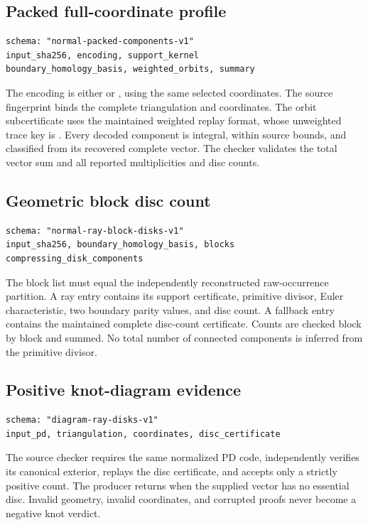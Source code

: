 \subsection{Packed full-coordinate profile}
\begin{lstlisting}
schema: "normal-packed-components-v1"
input_sha256, encoding, support_kernel
boundary_homology_basis, weighted_orbits, summary
\end{lstlisting}
The encoding is either  or , using the same selected
coordinates.  The source fingerprint binds the complete triangulation and
coordinates.  The orbit subcertificate uses the maintained weighted replay
format, whose unweighted trace key is .  Every decoded
component is integral, within source bounds, and classified from its recovered
complete vector.  The checker validates the total vector sum and all reported
multiplicities and disc counts.

\subsection{Geometric block disc count}
\begin{lstlisting}
schema: "normal-ray-block-disks-v1"
input_sha256, boundary_homology_basis, blocks
compressing_disk_components
\end{lstlisting}
The block list must equal the independently reconstructed raw-occurrence
partition.  A ray entry contains its support certificate, primitive divisor,
Euler characteristic, two boundary parity values, and disc count.  A fallback
entry contains the maintained complete disc-count certificate.  Counts are
checked block by block and summed.  No total number of connected components
is inferred from the primitive divisor.

\subsection{Positive knot-diagram evidence}
\begin{lstlisting}
schema: "diagram-ray-disks-v1"
input_pd, triangulation, coordinates, disc_certificate
\end{lstlisting}
The source checker requires the same normalized PD code, independently
verifies its canonical exterior, replays the disc certificate, and accepts
only a strictly positive count.  The producer returns 
when the supplied vector has no essential disc.  Invalid geometry, invalid
coordinates, and corrupted proofs never become a negative knot verdict.

